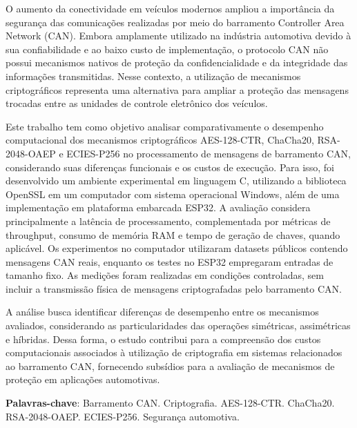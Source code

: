 \setlength{\absparsep}{18pt}
\begin{resumo}
    \SingleSpacing

    O aumento da conectividade em veículos modernos ampliou a importância da segurança das comunicações realizadas por meio do barramento Controller Area Network (CAN). Embora amplamente utilizado na indústria automotiva devido à sua confiabilidade e ao baixo custo de implementação, o protocolo CAN não possui mecanismos nativos de proteção da confidencialidade e da integridade das informações transmitidas. Nesse contexto, a utilização de mecanismos criptográficos representa uma alternativa para ampliar a proteção das mensagens trocadas entre as unidades de controle eletrônico dos veículos.

    Este trabalho tem como objetivo analisar comparativamente o desempenho computacional dos mecanismos criptográficos AES-128-CTR, ChaCha20, RSA-2048-OAEP e ECIES-P256 no processamento de mensagens de barramento CAN, considerando suas diferenças funcionais e os custos de execução. Para isso, foi desenvolvido um ambiente experimental em linguagem C, utilizando a biblioteca OpenSSL em um computador com sistema operacional Windows, além de uma implementação em plataforma embarcada ESP32. A avaliação considera principalmente a latência de processamento, complementada por métricas de throughput, consumo de memória RAM e tempo de geração de chaves, quando aplicável. Os experimentos no computador utilizaram datasets públicos contendo mensagens CAN reais, enquanto os testes no ESP32 empregaram entradas de tamanho fixo. As medições foram realizadas em condições controladas, sem incluir a transmissão física de mensagens criptografadas pelo barramento CAN.

    A análise busca identificar diferenças de desempenho entre os mecanismos avaliados, considerando as particularidades das operações simétricas, assimétricas e híbridas. Dessa forma, o estudo contribui para a compreensão dos custos computacionais associados à utilização de criptografia em sistemas relacionados ao barramento CAN, fornecendo subsídios para a avaliação de mecanismos de proteção em aplicações automotivas.

    \vspace{\onelineskip}
    \noindent\textbf{Palavras-chave}: Barramento CAN. Criptografia. AES-128-CTR. ChaCha20. RSA-2048-OAEP. ECIES-P256. Segurança automotiva.
\end{resumo}